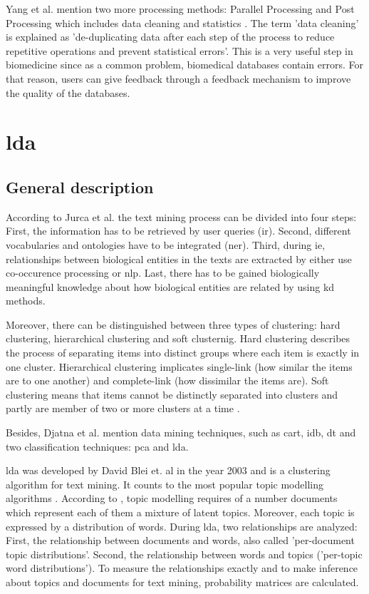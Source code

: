 Yang et al. mention two more processing methods: Parallel Processing and Post Processing which includes data cleaning and statistics \autocite{yang_2018}. The term 'data cleaning' is explained as 'de-duplicating data after each step of the process to reduce repetitive operations and prevent statistical errors'. This is a very useful step in biomedicine since as a common problem, biomedical databases contain errors. For that reason, users can give feedback through a feedback mechanism to improve the quality of the databases.
 
\chapter{\gls{lda}}\label{lda}
\section{General description}\label{lda_description}
According to Jurca et al. \autocite{jurca_2016} the text mining process can be divided into four steps: First, the information has to be retrieved by user queries (\gls{ir}). Second, different vocabularies and ontologies have to be integrated (\gls{ner}). Third, during \gls{ie}, relationships between biological entities in the texts are extracted by either use co-occurence processing or \gls{nlp}. Last, there has to be gained biologically meaningful knowledge about how biological entities are related by using \gls{kd} methods.

Moreover, there can be distinguished between three types of clustering: hard clustering, hierarchical clustering and soft clusternig. Hard clustering describes the process of separating items into distinct groups where each item is exactly in one cluster. Hierarchical clustering implicates single-link (how similar the items are to one another) and complete-link (how dissimilar the items are). Soft clustering means that items cannot be distinctly separated into clusters and partly are member of two or more clusters at a time \autocite{jurca_2016}.  

Besides, Djatna et al. \autocite{djatna_2018} mention data mining techniques, such as \gls{cart}, \gls{idb}, \gls{dt} and two classification techniques: \gls{pca} and \gls{lda}. 

\gls{lda} was developed by David Blei et. al in the year 2003 and is a clustering algorithm for text mining. It counts to the most popular topic modelling algorithms \autocite{zhao_2016}.
According to \autocite{zhao_2016}, topic modelling requires of a number documents which represent each of them a mixture of latent topics. Moreover, each topic is expressed by a distribution of words. During \gls{lda}, two relationships are analyzed: First, the relationship between documents and words, also called 'per-document topic distributions'. Second, the relationship between words and topics ('per-topic word distributions'). To measure the relationships exactly and to make inference about topics and documents for text mining, probability matrices are calculated.
 
